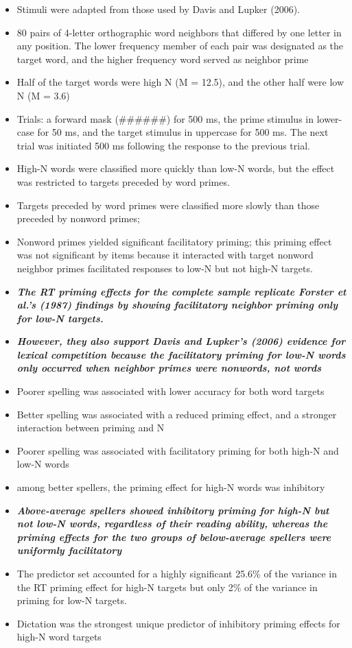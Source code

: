 \documentclass[]{article}
\begin{document}
\begin{itemize}
		\item Stimuli were adapted from those used by Davis and Lupker (2006).
		\item 80 pairs of 4-letter orthographic word neighbors that differed by one letter in any position. The lower frequency member of each pair was designated as the target word, and the higher frequency word served as neighbor prime
		\item Half of the target words were high N (M = 12.5), and the other half were low N (M = 3.6)
		\item Trials:  a forward mask (\#\#\#\#\#\#) for 500 ms, the prime stimulus in lower-case for 50 ms, and the target stimulus in uppercase for 500 ms. The next trial was initiated 500 ms following the response to the previous trial.
		\item High-N words were classified more quickly than low-N words, but the effect was restricted to targets preceded by word primes.
		\item Targets preceded by word primes were classified more slowly than those preceded by nonword primes; 
		\item Nonword primes yielded significant facilitatory priming; this priming effect was not significant by items because it interacted with target nonword neighbor primes facilitated responses to low-N but not high-N targets.
		\item \textbf{\textit{The RT priming effects for the complete sample replicate Forster et al.’s (1987) findings by showing facilitatory neighbor priming only for low-N targets.}} 
		\item \textbf{\textit{However, they also support Davis and Lupker’s (2006) evidence for lexical competition because the facilitatory priming for low-N words only occurred when neighbor primes were nonwords, not words}}
		\item Poorer spelling was associated with lower accuracy for both word targets
		\item Better spelling was associated with a reduced priming effect, and a stronger interaction between priming and N
		\item Poorer spelling was associated with facilitatory priming for both high-N and low-N words
		\item among better spellers, the priming effect for high-N words was inhibitory
		\item \textit{\textbf{Above-average spellers showed inhibitory priming for high-N but not low-N words, regardless of their reading ability, whereas the priming effects for the two groups of below-average spellers were uniformly facilitatory}}
		\item The predictor set accounted for a highly significant 25.6\% of the variance in the RT priming effect for high-N targets but only 2\% of the variance in priming for low-N targets.
		\item Dictation was the strongest unique predictor of inhibitory priming effects for high-N word targets
	\end{itemize}
	
\end{document}
